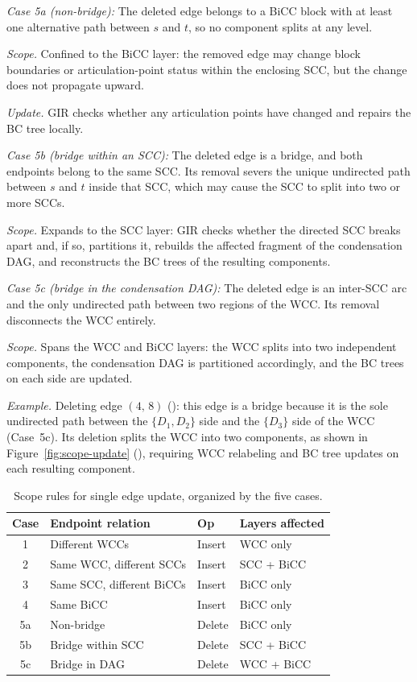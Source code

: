 \emph{Case 5a (non-bridge):}
The deleted edge belongs to a BiCC block with at least one alternative path between $s$ and $t$, so no component splits at any level.

\textit{Scope.} Confined to the BiCC layer: the removed edge may change block boundaries or articulation-point status within the enclosing SCC, but the change does not propagate upward.

\textit{Update.} GIR checks whether any articulation points have changed and repairs the BC tree locally.

\emph{Case 5b (bridge within an SCC):}
The deleted edge is a bridge, and both endpoints belong to the same SCC.
Its removal severs the unique undirected path between $s$ and $t$ inside that SCC, which may cause the SCC to split into two or more SCCs.

\textit{Scope.} Expands to the SCC layer: GIR checks whether the directed SCC breaks apart and, if so, partitions it, rebuilds the affected fragment of the condensation DAG, and reconstructs the BC trees of the resulting components.

\emph{Case 5c (bridge in the condensation DAG):}
The deleted edge is an inter-SCC arc and the only undirected path between two regions of the WCC.
Its removal disconnects the WCC entirely.

\textit{Scope.} Spans the WCC and BiCC layers: the WCC splits into two independent components, the condensation DAG is partitioned accordingly, and the BC trees on each side are updated.

\textit{Example.}
Deleting edge $(4,\,8)$ (): this edge is a bridge because it is the sole undirected path between the $\{D_1, D_2\}$ side and the $\{D_3\}$ side of the WCC (Case~5c).
Its deletion splits the WCC into two components, as shown in Figure~\ref{fig:scope-update} (), requiring WCC relabeling and BC tree updates on each resulting component.

\begin{table}[t]
    \centering
    \small
    \setlength{\tabcolsep}{4pt}
    \renewcommand{\arraystretch}{1.1}
    \caption{Scope rules for single edge update, organized by the five cases.}
    \begin{tabular}{c l l l}
    \toprule
    \textbf{Case} & \textbf{Endpoint relation} & \textbf{Op} & \textbf{Layers affected} \\
    \midrule
    1 & Different WCCs                & Insert & WCC only\\
    2 & Same WCC, different SCCs & Insert & SCC + BiCC\\
    3 & Same SCC, different BiCCs & Insert & BiCC only\\
    4 & Same BiCC                     & Insert & BiCC only\\
    \midrule
    5a & Non-bridge            & Delete & BiCC only \\
    5b & Bridge within SCC        & Delete & SCC + BiCC \\
    5c & Bridge in DAG            & Delete & WCC + BiCC \\
    \bottomrule
    \end{tabular}
    \label{tab:updates}
\end{table}


